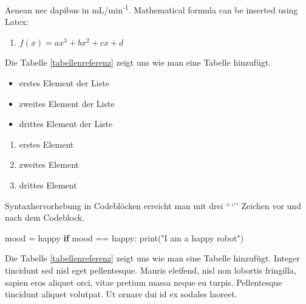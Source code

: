 \documentclass[
  12pt,
  a4paperpaper,
]{report}
\newenvironment{Shaded}{}{}
\newcommand{\BuiltInTok}[1]{\textcolor[rgb]{0.00,0.50,0.00}{#1}}
\newcommand{\ControlFlowTok}[1]{\textcolor[rgb]{0.00,0.44,0.13}{\textbf{#1}}}
\newcommand{\NormalTok}[1]{#1}
\newcommand{\OperatorTok}[1]{\textcolor[rgb]{0.40,0.40,0.40}{#1}}
\newcommand{\StringTok}[1]{\textcolor[rgb]{0.25,0.44,0.63}{#1}}
\providecommand{\tightlist}{%
  \setlength{\itemsep}{0pt}\setlength{\parskip}{0pt}}
\begin{document}
Aenean nec dapibus in mL/min\textsuperscript{-1}. Mathematical formula
can be inserted using Latex:

\begin{enumerate}
\def\labelenumi{(\arabic{enumi})}
\tightlist
\item
  \(f(x) = ax^3 + bx^2 + cx + d\)
\end{enumerate}

Die Tabelle \ref{tabellenreferenz} zeigt uns wie man eine Tabelle
hinzufügt.

\begin{itemize}
\tightlist
\item
  erstes Element der Liste
\item
  zweites Element der Liste
\item
  drittes Element der Liste
\end{itemize}

\begin{enumerate}
\def\labelenumi{\arabic{enumi}.}
\tightlist
\item
  erstes Element
\item
  zweites Element
\item
  drittes Element
\end{enumerate}

Syntaxhervorhebung in Codeblöcken erreicht man mit drei ``\,`'' Zeichen
vor und nach dem Codeblock.

\begin{Shaded}
\begin{Highlighting}[]
\NormalTok{mood }\OperatorTok{=} \StringTok{\textquotesingle{}happy\textquotesingle{}}
\ControlFlowTok{if}\NormalTok{ mood }\OperatorTok{==} \StringTok{\textquotesingle{}happy\textquotesingle{}}\NormalTok{:}
    \BuiltInTok{print}\NormalTok{(}\StringTok{"I am a happy robot"}\NormalTok{)}
\end{Highlighting}
\end{Shaded}

Die Tabelle \ref{tabellenreferenz} zeigt uns wie man eine Tabelle
hinzufügt. Integer tincidunt sed nisl eget pellentesque. Mauris
eleifend, nisl non lobortis fringilla, sapien eros aliquet orci, vitae
pretium massa neque eu turpis. Pellentesque tincidunt aliquet volutpat.
Ut ornare dui id ex sodales laoreet.

\newpage
\end{document}
